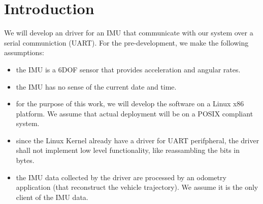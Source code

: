 \section{Introduction}
We will develop an driver for an IMU that communicate with our system over a serial communiction (UART).
For the pre-development, we make the following assumptions:
\begin{itemize}
    \item the IMU is a 6DOF sensor that provides acceleration and angular rates.
    \item the IMU has no sense of the current date and time.
    \item for the purpose of this work, we will develop the software on a Linux x86 platform. We assume that actual deployment will be on a POSIX compliant system.
    \item since the Linux Kernel already have a driver for UART perifpheral, the driver shall not implement low level functionality, like reassambling the bits in bytes.
    \item the IMU data collected by the driver are processed by an odometry application (that reconstruct the vehicle trajectory).
    We assume it is the only client of the IMU data.
\end{itemize}
